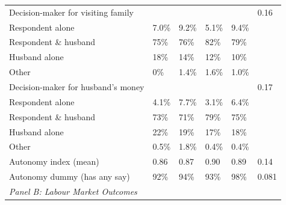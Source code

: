 \documentclass{article}        %
\begin{document}
\begin{landscape}
\begin{longtable}{@{}p{6cm}p{2.5cm}p{2.5cm}p{2.5cm}p{2.5cm}p{1.5cm}@{}}
\quad Decision-maker for visiting family     &        &        &        &        & 0.16  \\
\quad\quad Respondent alone                  & 7.0\%  & 9.2\%  & 5.1\%  & 9.4\%  &       \\
\quad\quad Respondent \& husband             & 75\%   & 76\%   & 82\%   & 79\%   &       \\
\quad\quad Husband alone                     & 18\%   & 14\%   & 12\%   & 10\%   &       \\
\quad\quad Other                             & 0\%    & 1.4\%  & 1.6\%  & 1.0\%  &       \\[4pt]

\quad Decision-maker for husband's money     &        &        &        &        & 0.17  \\
\quad\quad Respondent alone                  & 4.1\%  & 7.7\%  & 3.1\%  & 6.4\%  &       \\
\quad\quad Respondent \& husband             & 73\%   & 71\%   & 79\%   & 75\%   &       \\
\quad\quad Husband alone                     & 22\%   & 19\%   & 17\%   & 18\%   &       \\
\quad\quad Other                             & 0.5\%  & 1.8\%  & 0.4\%  & 0.4\%  &       \\[4pt]

\quad Autonomy index (mean)                  & 0.86   & 0.87   & 0.90   & 0.89   & 0.14  \\
\quad Autonomy dummy (has any say)           & 92\%   & 94\%   & 93\%   & 98\%   & 0.081 \\[6pt]

\multicolumn{6}{l}{\textit{Panel B: Labour Market Outcomes}} \\[2pt]


\end{longtable}
\end{landscape}
\end{document}
